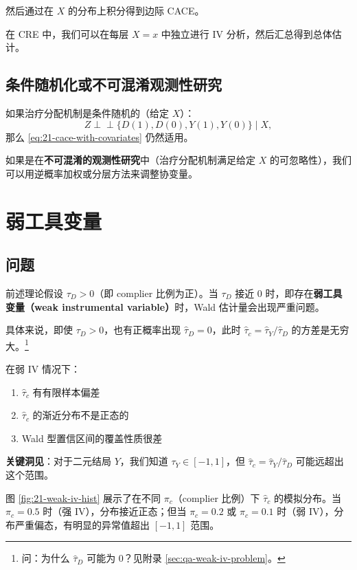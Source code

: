 然后通过在 $X$ 的分布上积分得到边际 CACE。

在 CRE 中，我们可以在每层 $X = x$ 中独立进行 IV 分析，然后汇总得到总体估计。

\subsection{条件随机化或不可混淆观测性研究}

如果治疗分配机制是条件随机的（给定 $X$）：
\[
Z \perp\!\!\!\perp \{D(1), D(0), Y(1), Y(0)\} \mid X,
\]
那么 \cref{eq:21-cace-with-covariates} 仍然适用。

如果是在\textbf{不可混淆的观测性研究}中（治疗分配机制满足给定 $X$ 的可忽略性），我们可以用逆概率加权或分层方法来调整协变量。

\section{弱工具变量}
\label{sec:21-weak-iv}

\subsection{问题}

前述理论假设 $\tau_D > 0$（即 complier 比例为正）。当 $\tau_D$ 接近 0 时，即存在\textbf{弱工具变量（weak instrumental variable）}时，Wald 估计量会出现严重问题。

具体来说，即使 $\tau_D > 0$，也有正概率出现 $\hat{\tau}_D = 0$，此时 $\hat{\tau}_c = \hat{\tau}_Y / \hat{\tau}_D$ 的方差是无穷大。\footnote{问：为什么 $\hat{\tau}_D$ 可能为 0？见附录 \cref{sec:qa-weak-iv-problem}。}

在弱 IV 情况下：
\begin{enumerate}
  \item $\hat{\tau}_c$ 有有限样本偏差
  \item $\hat{\tau}_c$ 的渐近分布不是正态的
  \item Wald 型置信区间的覆盖性质很差
\end{enumerate}

\textbf{关键洞见}：对于二元结局 $Y$，我们知道 $\tau_Y \in [-1, 1]$，但 $\hat{\tau}_c = \hat{\tau}_Y / \hat{\tau}_D$ 可能远超出这个范围。

图 \ref{fig:21-weak-iv-hist} 展示了在不同 $\pi_c$（complier 比例）下 $\hat{\tau}_c$ 的模拟分布。当 $\pi_c = 0.5$ 时（强 IV），分布接近正态；但当 $\pi_c = 0.2$ 或 $\pi_c = 0.1$ 时（弱 IV），分布严重偏态，有明显的异常值超出 $[-1, 1]$ 范围。

